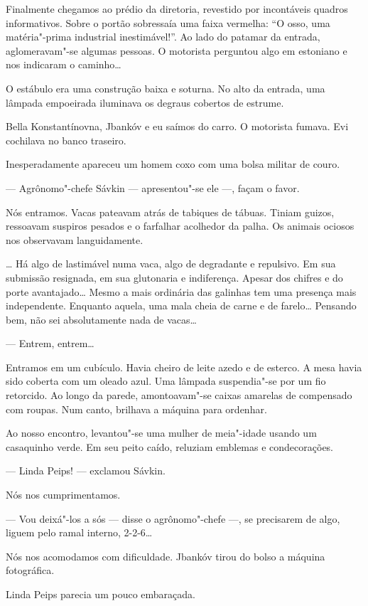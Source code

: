 Finalmente chegamos ao prédio da diretoria, revestido por incontáveis
quadros informativos. Sobre o portão sobressaía uma faixa vermelha: ``O
osso, uma matéria"-prima industrial inestimável!''. Ao lado do patamar da
entrada, aglomeravam"-se algumas pessoas. O motorista perguntou algo em
estoniano e nos indicaram o caminho\ldots{}

O estábulo era uma construção baixa e soturna. No alto da entrada, uma
lâmpada empoeirada iluminava os degraus cobertos de estrume.

Bella Konstantínovna, Jbankóv e eu saímos do carro. O motorista fumava.
Evi cochilava no banco traseiro.

Inesperadamente apareceu um homem coxo com uma bolsa militar de couro.

--- Agrônomo"-chefe Sávkin --- apresentou"-se ele ---, façam o favor.

Nós entramos. Vacas pateavam atrás de tabiques de tábuas. Tiniam
guizos, ressoavam suspiros pesados e o farfalhar acolhedor da palha.
Os animais ociosos nos observavam languidamente.

\ldots{} Há algo de lastimável numa vaca, algo de degradante e repulsivo. Em
sua submissão resignada, em sua glutonaria e indiferença. Apesar dos
chifres e do porte avantajado\ldots{} Mesmo a mais ordinária das galinhas tem
uma presença mais independente. Enquanto aquela, uma mala cheia de carne
e de farelo\ldots{} Pensando bem, não sei absolutamente nada de vacas\ldots{}

--- Entrem, entrem\ldots{}

Entramos em um cubículo. Havia cheiro de leite azedo e de esterco. A
mesa havia sido coberta com um oleado azul. Uma lâmpada suspendia"-se por
um fio retorcido. Ao longo da parede, amontoavam"-se caixas amarelas de
compensado com roupas. Num canto, brilhava a máquina para ordenhar.

Ao nosso encontro, levantou"-se uma mulher de meia"-idade usando um
casaquinho verde. Em seu peito caído, reluziam emblemas e condecorações.

--- Linda Peips! --- exclamou Sávkin.

Nós nos cumprimentamos.

--- Vou deixá"-los a sós --- disse o agrônomo"-chefe
---, se precisarem de algo, liguem pelo ramal interno, 2-2-6\ldots{}

Nós nos acomodamos com dificuldade. Jbankóv tirou do bolso a máquina
fotográfica.

Linda Peips parecia um pouco embaraçada.

